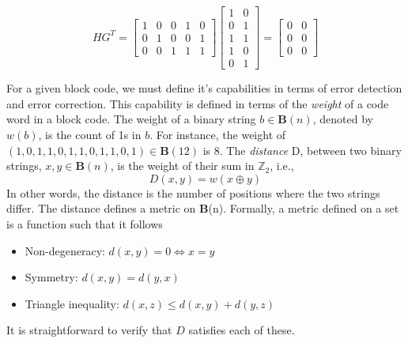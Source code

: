 \documentclass{article}
\begin{document}
\[
HG^T = \begin{bmatrix}
1 & 0 & 0 & 1 & 0 \\
0 & 1 & 0 & 0 & 1 \\
0 & 0 & 1 & 1 & 1
\end{bmatrix}
\begin{bmatrix}
1 & 0 \\
0 & 1 \\
1 & 1 \\
1 & 0 \\
0 & 1
\end{bmatrix}
= 
\begin{bmatrix}
0 & 0 \\
0 & 0 \\
0 & 0
\end{bmatrix}
\]

For a given block code, we must define it's capabilities in terms of error detection and error
correction. This capability is defined in terms of the \textit{weight} of a code word in a 
block code. The weight of a binary string \(b \in \mathbf{B}(n)\), denoted by \(w(b)\), is the count of
1s in \(b\). For instance, the weight of \((1,0,1,1,0,1,1,0,1,1,0,1) \in \mathbf{B}(12)\) is 8.
The \textit{distance} D, between two binary strings, \(x , y \in \mathbf{B}(n)\), is the weight of their 
sum in \(\mathbb{Z}_2\), i.e., 
\[D(x, y) = w(x \oplus y)\]
In other words, the distance is the number of positions where the two strings differ.
The distance defines a metric \cite{hamming1950error} on \textbf{B}(n). Formally, a metric defined on a set 
is a function such that it follows
\begin{itemize}
\item Non-degeneracy: \(d(x, y) = 0 \iff x = y\)
\item Symmetry: \(d(x, y) = d(y, x)\)
\item Triangle inequality: \(d(x, z) \leq d(x, y) + d(y, z)\)
\end{itemize}
It is straightforward to verify that \(D\) satisfies each of these.
\end{document}
